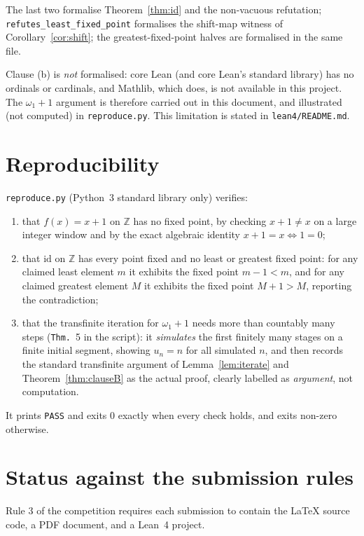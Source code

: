 \documentclass[11pt]{article}
\theoremstyle{definition}
\theoremstyle{remark}
\newcommand{\Z}{\mathbb{Z}}
\newcommand{\id}{\mathrm{id}}
\begin{document}
\noindent The last two formalise Theorem~\ref{thm:id} and the non-vacuous
refutation; \texttt{refutes\_least\_fixed\_point} formalises the shift-map
witness of Corollary~\ref{cor:shift}; the greatest-fixed-point halves are
formalised in the same file.

Clause (b) is \emph{not} formalised: core Lean (and core Lean's standard
library) has no ordinals or cardinals, and Mathlib, which does, is not
available in this project. The $\omega_1+1$ argument is therefore carried out
in this document, and illustrated (not computed) in \texttt{reproduce.py}. This
limitation is stated in \texttt{lean4/README.md}.

\section{Reproducibility}

\texttt{reproduce.py} (Python~3 standard library only) verifies:

\begin{enumerate}
  \item that $f(x)=x+1$ on $\Z$ has no fixed point, by checking
    $x+1\neq x$ on a large integer window and by the exact algebraic identity
    $x+1=x \iff 1=0$;
  \item that $\id$ on $\Z$ has every point fixed and no least or greatest
    fixed point: for any claimed least element $m$ it exhibits the fixed point
    $m-1<m$, and for any claimed greatest element $M$ it exhibits the fixed
    point $M+1>M$, reporting the contradiction;
  \item that the transfinite iteration for $\omega_1+1$ needs more than
    countably many steps (\texttt{Thm.}~5 in the script): it
    \emph{simulates} the first finitely many stages on a finite initial
    segment, showing $u_n=n$ for all simulated $n$, and then records the
    standard transfinite argument of Lemma~\ref{lem:iterate} and
    Theorem~\ref{thm:clauseB} as the actual proof, clearly labelled as
    \emph{argument}, not computation.
\end{enumerate}

It prints \texttt{PASS} and exits $0$ exactly when every check holds, and exits
non-zero otherwise.

\section{Status against the submission rules}

Rule 3 of the competition requires each submission to contain the LaTeX source
code, a PDF document, and a Lean~4 project.
\end{document}
